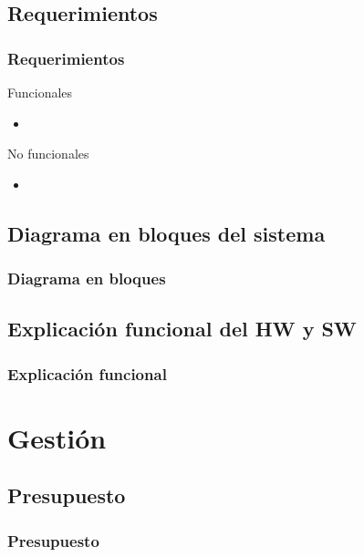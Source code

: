 \subsection{Requerimientos}
\begin{frame}
	\frametitle{Requerimientos}
	\begin{block}{Funcionales}
		\begin{itemize}
			\item 
		\end{itemize}
	\end{block}

	\begin{block}{No funcionales}
		\begin{itemize}
			\item 
		\end{itemize}
	\end{block}

\end{frame}

\subsection{Diagrama en bloques del sistema}
\begin{frame}
	\frametitle{Diagrama en bloques}
\end{frame}

\subsection{Explicación funcional del HW y SW}
\begin{frame}
	\frametitle{Explicación funcional}

\end{frame}

\section{Gestión}

\subsection{Presupuesto}
\begin{frame}
	\frametitle{Presupuesto}
	
\end{frame}